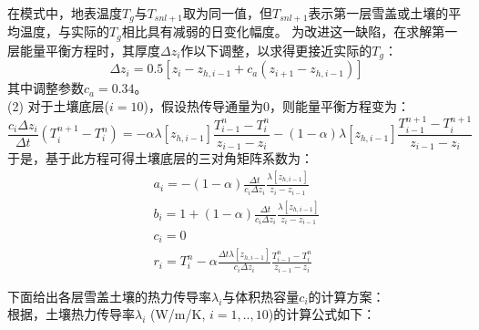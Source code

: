 在模式中，地表温度$T_g$与$T_{snl+1}$取为同一值，但$T_{snl+1}$表示第一层雪盖或土壤的平均温度，与实际的$T_g$相比具有减弱的日变化幅度。
为改进这一缺陷，在求解第一层能量平衡方程时，其厚度$\Delta z_i$作以下调整，以求得更接近实际的$T_g$：
\begin{equation}
\Delta z_{i}=0.5\left[z_{i}-z_{h, i-1}+c_{a}\left(z_{i+1}-z_{h, i-1}\right)\right]
\end{equation}
其中调整参数$c_a=0.34$。\\
(2) 对于土壤底层($i=10$)，假设热传导通量为0，则能量平衡方程变为：
\begin{equation}
\frac{c_{i} \Delta z_{i}}{\Delta t}\left(T_{i}^{n+1}-T_{i}^{n}\right)=-\alpha \lambda\left[z_{h, i-1}\right] \frac{T_{i-1}^{n}-T_{i}^{n}}{z_{i-1}-z_{i}}-(1-\alpha) \lambda\left[z_{h, i-1}\right] \frac{T_{i-1}^{n+1}-T_{i}^{n+1}}{z_{i-1}-z_{i}}
\end{equation}
于是，基于此方程可得土壤底层的三对角矩阵系数为：
\begin{equation}
\begin{array}{c}a_{i}=-(1-\alpha) \frac{\Delta t}{c_{i} \Delta z_{i}} \frac{\lambda\left[z_{h, i-1}\right]}{z_{i}-z_{i-1}} \\ b_{i}=1+(1-\alpha) \frac{\Delta t}{c_{i} \Delta z_{i}} \frac{\lambda\left[z_{h, i-1}\right]}{z_{i}-z_{i-1}} \\ c_{i}=0 \\ r_{i}=T_{i}^{n}-\alpha \frac{\Delta t \lambda\left[z_{h, i-1}\right]}{c_{i} \Delta z_{i}} \frac{T_{i-1}^{n}-T_{i}^{n}}{z_{i-1}-z_{i}}\end{array}
\end{equation}


下面给出各层雪盖土壤的热力传导率$\lambda_i$与体积热容量$c_i$的计算方案：\\

根据\citet{farouki1981thermal}，土壤热力传导率$\lambda_i$ (W/m/K, $i=1,..,10$)的计算公式如下：

